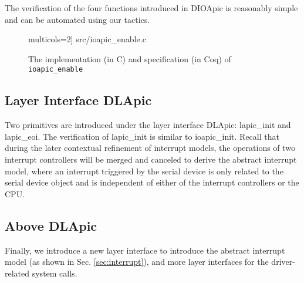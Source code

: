 The verification of the four functions introduced in DIOApic is reasonably
simple and can be automated using our tactics.

\begin{figure}
	 multicols=2] {src/ioapic_enable.c}
	\caption{The implementation (in C) and specification (in Coq) of \texttt{ioapic\_enable}}
	\label{fig:ioapic_enable_v}
\end{figure}

\subsection{Layer Interface DLApic}

Two primitives are introduced under the layer interface DLApic:
\textsf{lapic\_init} and \textsf{lapic\_eoi}. The verification of
\textsf{lapic\_init} is similar to \textsf{ioapic\_init}. Recall that during the
later contextual refinement of interrupt models, the operations of two interrupt
controllers will be merged and canceled to derive the abstract interrupt model,
where an interrupt triggered by the serial device is only related to the serial
device object and is independent of either of the interrupt controllers or
the CPU.


\subsection{Above DLApic}

Finally, we introduce a new layer interface to introduce the abstract interrupt
model (as shown in Sec. \ref{sec:interrupt}), and more layer interfaces
for the driver-related system calls.




